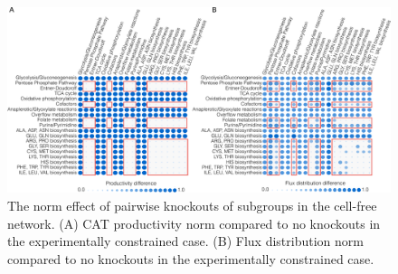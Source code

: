\documentclass[journal=asbcd6,manuscript=article]{achemso}
\begin{document}
\clearpage

\begin{figure}[t!]
\includegraphics[width=1.0\textwidth]{./figs/Fig-7-FluxDistribution-Analysis.pdf}
\caption{The norm effect of pairwise knockouts of subgroups in the cell-free network.
(A) CAT productivity norm compared to no knockouts in the experimentally constrained case.
(B) Flux distribution norm compared to no knockouts in the experimentally constrained case.}
\label{fig:norm}
\end{figure}

\clearpage


\end{document}
